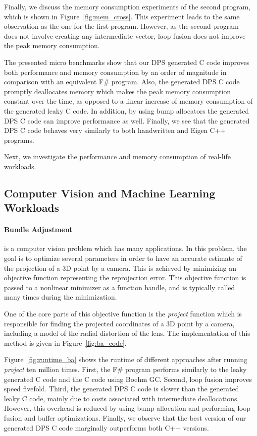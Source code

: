 Finally, we discuss the memory consumption experiments of the second program, which is shown in Figure~\ref{fig:mem_cross}. This experiment leads to the same observation as the one for the first program. However, as the second program does not involve creating any intermediate vector, loop fusion does not improve the peak memory consumption.

The presented micro benchmarks show that our DPS generated C code improves both performance and memory consumption by an order of magnitude in comparison with an equivalent F\# program. 
Also, the generated DPS C code promptly deallocates memory which makes the peak memory consumption constant over the time, as opposed to a linear increase of memory consumption of the generated leaky C code. In addition, by using bump allocators the generated DPS C code can improve performance as well. 
Finally, we see that the generated DPS C code behaves very similarly to both handwritten and Eigen C++ programs.

Next, we investigate the performance and memory consumption of real-life workloads.

\subsection{Computer Vision and Machine Learning Workloads}
\paragraph{Bundle Adjustment} \cite{triggs1999bundle} is a  computer vision problem which has many applications. In this problem, the goal is to optimize several parameters in order to have an accurate estimate of the projection of a 3D point by a camera. This is achieved by minimizing an objective function representing the reprojection error.  This objective function is passed to a nonlinear minimizer as a function handle, and is typically called many times during the minimization.

One of the core parts of this objective function is the \emph{project} function which is responsible for finding the projected coordinates of a 3D point by a camera, including a model of the radial distortion of the lens. The \lafsharp{} implementation of this method is given in Figure~\ref{fig:ba_code}.


Figure~\ref{fig:runtime_ba} shows the runtime of different approaches after running \emph{project} ten million times. First, the F\# program performs similarly to the leaky generated C code and the C code using Boehm GC. Second, loop fusion improves speed fivefold. Third, the generated DPS C code is slower than the generated leaky C code, mainly due to costs associated with intermediate deallocations. However, this overhead is reduced by using bump allocation and performing loop fusion and buffer optimizations. Finally, we observe that the best version of our generated DPS C code marginally  outperforms both C++ versions.

